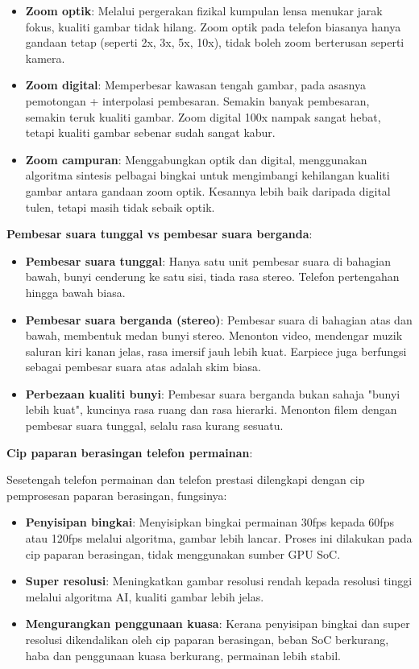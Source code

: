 \begin{itemize}
  \item \textbf{Zoom optik}: Melalui pergerakan fizikal kumpulan lensa menukar jarak fokus, kualiti gambar tidak hilang. Zoom optik pada telefon biasanya hanya gandaan tetap (seperti 2x, 3x, 5x, 10x), tidak boleh zoom berterusan seperti kamera.
  \item \textbf{Zoom digital}: Memperbesar kawasan tengah gambar, pada asasnya pemotongan + interpolasi pembesaran. Semakin banyak pembesaran, semakin teruk kualiti gambar. Zoom digital 100x nampak sangat hebat, tetapi kualiti gambar sebenar sudah sangat kabur.
  \item \textbf{Zoom campuran}: Menggabungkan optik dan digital, menggunakan algoritma sintesis pelbagai bingkai untuk mengimbangi kehilangan kualiti gambar antara gandaan zoom optik. Kesannya lebih baik daripada digital tulen, tetapi masih tidak sebaik optik.
\end{itemize}


\textbf{Pembesar suara tunggal vs pembesar suara berganda}:

\begin{itemize}
  \item \textbf{Pembesar suara tunggal}: Hanya satu unit pembesar suara di bahagian bawah, bunyi cenderung ke satu sisi, tiada rasa stereo. Telefon pertengahan hingga bawah biasa.
  \item \textbf{Pembesar suara berganda (stereo)}: Pembesar suara di bahagian atas dan bawah, membentuk medan bunyi stereo. Menonton video, mendengar muzik saluran kiri kanan jelas, rasa imersif jauh lebih kuat. Earpiece juga berfungsi sebagai pembesar suara atas adalah skim biasa.
  \item \textbf{Perbezaan kualiti bunyi}: Pembesar suara berganda bukan sahaja "bunyi lebih kuat", kuncinya rasa ruang dan rasa hierarki. Menonton filem dengan pembesar suara tunggal, selalu rasa kurang sesuatu.
\end{itemize}

\textbf{Cip paparan berasingan telefon permainan}:

Sesetengah telefon permainan dan telefon prestasi dilengkapi dengan cip pemprosesan paparan berasingan, fungsinya:

\begin{itemize}
  \item \textbf{Penyisipan bingkai}: Menyisipkan bingkai permainan 30fps kepada 60fps atau 120fps melalui algoritma, gambar lebih lancar. Proses ini dilakukan pada cip paparan berasingan, tidak menggunakan sumber GPU SoC.
  \item \textbf{Super resolusi}: Meningkatkan gambar resolusi rendah kepada resolusi tinggi melalui algoritma AI, kualiti gambar lebih jelas.
  \item \textbf{Mengurangkan penggunaan kuasa}: Kerana penyisipan bingkai dan super resolusi dikendalikan oleh cip paparan berasingan, beban SoC berkurang, haba dan penggunaan kuasa berkurang, permainan lebih stabil.
\end{itemize}

